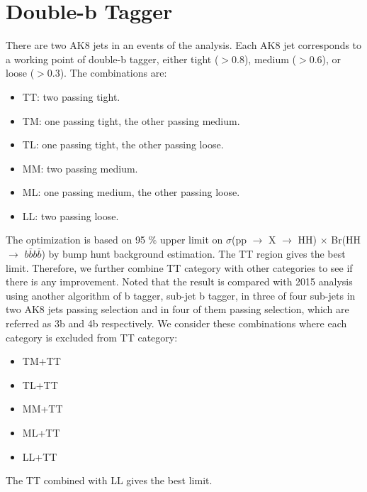 \clearpage
\section{Double-b Tagger}
There are two AK8 jets in an events of the analysis. Each AK8 jet corresponds to a working point of double-b tagger, either tight ($>$0.8), medium ($>$0.6), or loose ($>$0.3). The combinations are: 
\begin{itemize}
\item TT: two passing tight.
\item TM: one passing tight, the other passing medium.
\item TL: one passing tight, the other passing loose.
\item MM: two passing medium.
\item ML: one passing medium, the other passing loose.
\item LL: two passing loose.
\end{itemize}
The optimization is based on 95 $\% $ upper limit on $\sigma$(pp $\rightarrow$ X $\rightarrow$ HH) $\times$ Br(HH $\rightarrow$ $b\bar{b}b\bar{b}$) by bump hunt background estimation. The TT region gives the best limit. Therefore, we further combine TT category with other categories to see if there is any improvement. Noted that the result is compared with 2015 analysis using another algorithm of b tagger, sub-jet b tagger, in three of four sub-jets in two AK8 jets passing selection and in four of them passing selection, which are referred as 3b and 4b respectively. We consider these combinations where each category is excluded from TT category:

\begin{itemize}
\item TM+TT
\item TL+TT
\item MM+TT
\item ML+TT
\item LL+TT
\end{itemize}
The TT combined with LL gives the best limit.

